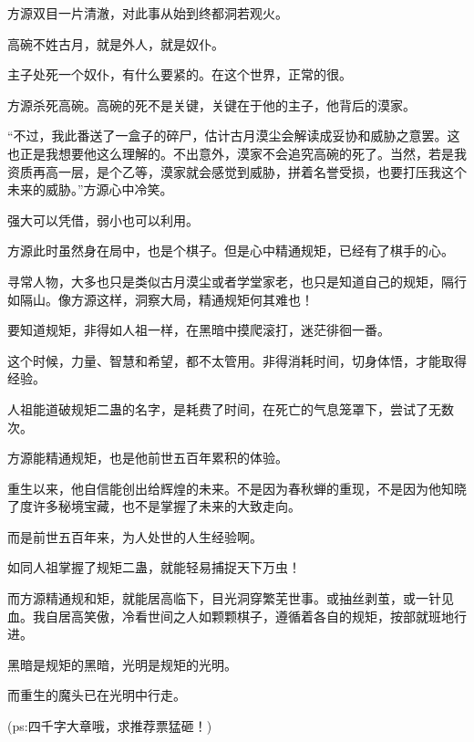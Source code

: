 \begin{this_body}
方源双目一片清澈，对此事从始到终都洞若观火。

高碗不姓古月，就是外人，就是奴仆。

主子处死一个奴仆，有什么要紧的。在这个世界，正常的很。

方源杀死高碗。高碗的死不是关键，关键在于他的主子，他背后的漠家。

“不过，我此番送了一盒子的碎尸，估计古月漠尘会解读成妥协和威胁之意罢。这也正是我想要他这么理解的。不出意外，漠家不会追究高碗的死了。当然，若是我资质再高一层，是个乙等，漠家就会感觉到威胁，拼着名誉受损，也要打压我这个未来的威胁。”方源心中冷笑。

强大可以凭借，弱小也可以利用。

方源此时虽然身在局中，也是个棋子。但是心中精通规矩，已经有了棋手的心。

寻常人物，大多也只是类似古月漠尘或者学堂家老，也只是知道自己的规矩，隔行如隔山。像方源这样，洞察大局，精通规矩何其难也！

要知道规矩，非得如人祖一样，在黑暗中摸爬滚打，迷茫徘徊一番。

这个时候，力量、智慧和希望，都不太管用。非得消耗时间，切身体悟，才能取得经验。

人祖能道破规矩二蛊的名字，是耗费了时间，在死亡的气息笼罩下，尝试了无数次。

方源能精通规矩，也是他前世五百年累积的体验。

重生以来，他自信能创出给辉煌的未来。不是因为春秋蝉的重现，不是因为他知晓了度许多秘境宝藏，也不是掌握了未来的大致走向。

而是前世五百年来，为人处世的人生经验啊。

如同人祖掌握了规矩二蛊，就能轻易捕捉天下万虫！

而方源精通规和矩，就能居高临下，目光洞穿繁芜世事。或抽丝剥茧，或一针见血。我自居高笑傲，冷看世间之人如颗颗棋子，遵循着各自的规矩，按部就班地行进。

黑暗是规矩的黑暗，光明是规矩的光明。

而重生的魔头已在光明中行走。

(ps:四千字大章哦，求推荐票猛砸！)

\end{this_body}

